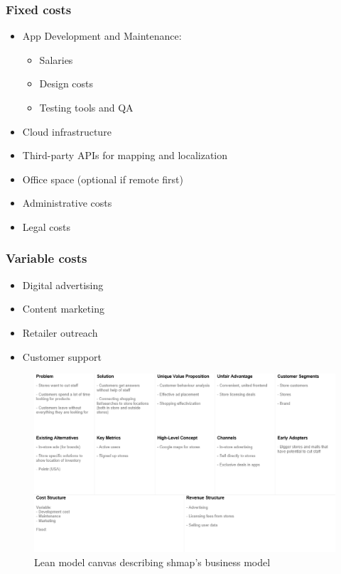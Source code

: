 \documentclass[titlepage]{article}
\def\companyName{shmap}
\begin{document}
\subsubsection{Fixed costs}
\begin{itemize}
  \item App Development and Maintenance:
  \begin{itemize}
    \item Salaries
    \item Design costs
    \item Testing tools and QA
  \end{itemize}
    \item Cloud infrastructure
    \item Third-party APIs for mapping and localization
    \item Office space (optional if remote first)
    \item Administrative costs
    \item Legal costs
  \end{itemize}
  \subsubsection{Variable costs}
  \begin{itemize}
    \item Digital advertising
    \item Content marketing
    \item Retailer outreach
    \item Customer support
  \end{itemize}

\begin{figure}[ht]
    \centering
    \includegraphics[width=1\textwidth]{lean model canvas.png}
    \caption{Lean model canvas describing \companyName's business model}
    \label{fig:lean-model-canvas}
\end{figure}
\end{document}
